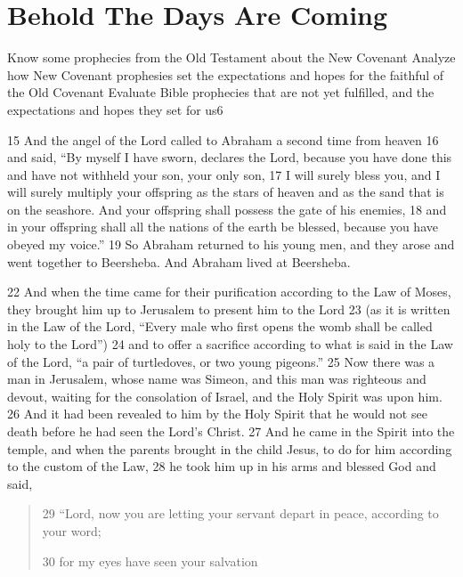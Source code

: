 \chapter{Behold The Days Are Coming}
\begin{goals}
\goal Know some prophecies from the Old Testament about the New Covenant
\goal Analyze how New Covenant prophesies set the expectations and hopes for the faithful of the Old Covenant
\goal Evaluate Bible prophecies that are not yet fulfilled, and the expectations and hopes they set for us6
\end{goals}
\begin{bible}


15 And the angel of the Lord called to Abraham a second time from heaven 16 and said, ``By myself I have sworn, declares the Lord, because you have done this and have not withheld your son, your only son, 17 I will surely bless you, and I will surely multiply your offspring as the stars of heaven and as the sand that is on the seashore. And your offspring shall possess the gate of his enemies, 18 and in your offspring shall all the nations of the earth be blessed, because you have obeyed my voice.'' 19 So Abraham returned to his young men, and they arose and went together to Beersheba. And Abraham lived at Beersheba.

22 And when the time came for their purification according to the Law of Moses, they brought him up to Jerusalem to present him to the Lord 23 (as it is written in the Law of the Lord, ``Every male who first opens the womb shall be called holy to the Lord'') 24 and to offer a sacrifice according to what is said in the Law of the Lord, ``a pair of turtledoves, or two young pigeons.'' 25 Now there was a man in Jerusalem, whose name was Simeon, and this man was righteous and devout, waiting for the consolation of Israel, and the Holy Spirit was upon him. 26 And it had been revealed to him by the Holy Spirit that he would not see death before he had seen the Lord's Christ. 27 And he came in the Spirit into the temple, and when the parents brought in the child Jesus, to do for him according to the custom of the Law, 28 he took him up in his arms and blessed God and said,

\begin{quote}
29 ``Lord, now you are letting your servant depart in peace, according to your word;

30 for my eyes have seen your salvation


\end{quote}
\end{bible}
